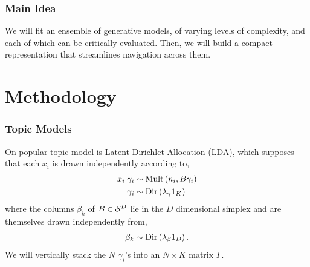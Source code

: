 \documentclass[hyperref={colorlinks=true, linkcolor=violet, citecolor=SeaGreen}]{beamer}
\begin{document}
\begin{frame}
  \frametitle{Main Idea}
  We will fit an ensemble of generative models, of varying levels of complexity,
  and each of which can be critically evaluated. Then, we will build a compact
  representation that streamlines navigation across them.

\begin{figure}
    \centering
\end{figure}
\end{frame}

\section{Methodology}

\begin{frame}
  \frametitle{Topic Models}
  On popular topic model is Latent Dirichlet Allocation (LDA), which supposes
  that each $x_{i}$ is drawn independently according to,
  \begin{align*}
  x_i \vert \gamma_i &\sim \text{Mult}\left(n_{i}, B\gamma_{i}\right) \\
  \gamma_{i} &\sim \text{Dir}\left(\lambda_{\gamma} 1_{K}\right)
  \end{align*}
  where the columns $\beta_{k}$ of $B \in \mathcal{S}^{D}$ lie in the $D$
  dimensional simplex and are themselves drawn independently from,
  \begin{align*}
  \beta_{k} \sim \text{Dir}\left(\lambda_{\beta} 1_{D}\right).
\end{align*}
  We will vertically stack the $N$ $\gamma_i$'s into an $N \times K$ matrix
  $\Gamma$.
\end{frame}
\end{document}

